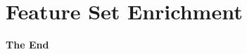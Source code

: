\documentclass[aspectratio=169,xcolor=dvipsnames]{beamer}
\begin{document}


\section{Feature Set Enrichment}



\begin{frame}
    \Huge{\centerline{\textbf{The End}}}
\end{frame}

\end{document}
